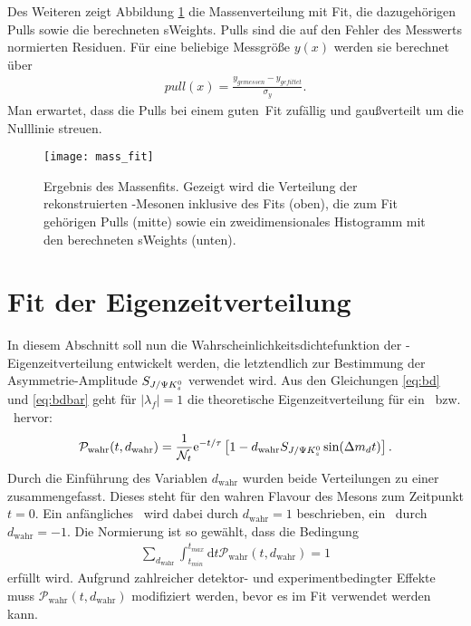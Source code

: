 Des Weiteren zeigt Abbildung \ref{fig:fit_masse} die Massenverteilung mit Fit, die dazugehörigen Pulls sowie die berechneten sWeights. Pulls sind die auf den Fehler des Messwerts normierten Residuen. Für eine beliebige Messgröße $y(x)$ werden sie berechnet über
\begin{align}
pull(x) = \frac{y_{gemessen}-y_{gefittet}}{\sigma_y}.
\end{align}
Man erwartet, dass die Pulls bei einem \glqq guten\grqq\ Fit zufällig und gaußverteilt um die Nulllinie streuen.

\begin{figure}[hptb]
\centering
\texttt{[image: mass\_fit]}
\caption{Ergebnis des Massenfits. Gezeigt wird die Verteilung der rekonstruierten \Bd-Mesonen inklusive des Fits (oben), die zum Fit gehörigen Pulls (mitte) sowie ein zweidimensionales Histogramm mit den berechneten sWeights (unten).}
\label{fig:fit_masse}
\end{figure}


\section{Fit der Eigenzeitverteilung} \label{kap:eigenzeitverteilung}
In diesem Abschnitt soll nun die Wahrscheinlichkeitsdichtefunktion der \Bd-Ei\-gen\-zeit\-ver\-tei\-lung entwickelt werden, die letztendlich zur Bestimmung der Asymmetrie-Amplitude $S_{J/\Psi K_s^0}$ verwendet wird. Aus den Gleichungen \ref{eq:bd} und \ref{eq:bdbar} geht für $|\lambda_f|=1$ die theoretische Eigenzeitverteilung für ein \Bd\ bzw. \Bdbar\ hervor:
\begin{align}
\mathcal{P}_{\text{wahr}}(t, d_{\text{wahr}}) = \frac{1}{\mathcal{N}_t}\mathrm{e}^{-t/\tau}\left[1-d_{\text{wahr}}S_{J/\Psi K_s^0}\sin(\Delta m_d t)\right].
\end{align}
Durch die Einführung des Variablen $d_{\text{wahr}}$ wurden beide Verteilungen zu einer zusammengefasst. Dieses steht für den wahren Flavour des Mesons zum Zeitpunkt $t=0$. Ein anfängliches \Bd\ wird dabei durch $d_{\text{wahr}}=1$ beschrieben, ein \Bdbar\ durch $d_{\text{wahr}}=-1$. Die Normierung ist so gewählt, dass die Bedingung
\begin{align}
\sum_{d_{\text{wahr}}}\int_{t_{min}}^{t_{max}}\mathrm{d}t\mathcal{P}_{\text{wahr}}(t, d_{\text{wahr}}) = 1
\end{align}
erfüllt wird. Aufgrund zahlreicher detektor- und experimentbedingter Effekte muss $\mathcal{P}_{\text{wahr}}(t, d_{\text{wahr}})$ modifiziert werden, bevor es im Fit verwendet werden kann.

